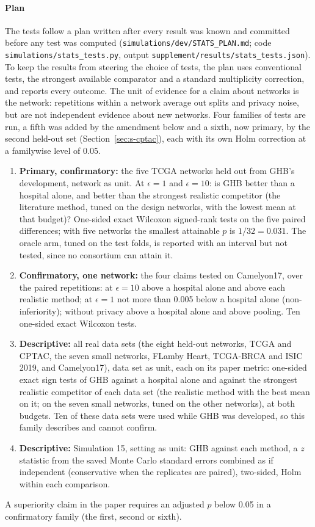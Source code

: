 \documentclass[acmsmall,screen,nonacm]{acmart}
\theoremstyle{acmdefinition}
\begin{document}
\paragraph{Plan} The tests follow a plan written after every result was known and committed before any test was computed (\texttt{simulations/dev/STATS\_PLAN.md}; code \texttt{simulations/stats\_tests.py}, output \texttt{supplement/results/stats\_tests.json}). To keep the results from steering the choice of tests, the plan uses conventional tests, the strongest available comparator and a standard multiplicity correction, and reports every outcome. The unit of evidence for a claim about networks is the network: repetitions within a network average out splits and privacy noise, but are not independent evidence about new networks. Four families of tests are run, a fifth was added by the amendment below and a sixth, now primary, by the second held-out set (Section~\ref{sec:s-cptac}), each with its own Holm correction \cite{holm1979simple} at a familywise level of 0.05.
\begin{enumerate}
\item \textbf{Primary, confirmatory:} the five TCGA networks held out from GHB's development, network as unit. At $\epsilon=1$ and $\epsilon=10$: is GHB better than a hospital alone, and better than the strongest realistic competitor (the literature method, tuned on the design networks, with the lowest mean at that budget)? One-sided exact Wilcoxon signed-rank tests \cite{wilcoxon1945individual} on the five paired differences; with five networks the smallest attainable $p$ is $1/32=0.031$. The oracle arm, tuned on the test folds, is reported with an interval but not tested, since no consortium can attain it.
\item \textbf{Confirmatory, one network:} the four claims tested on Camelyon17, over the \SimCamReps{} paired repetitions: at $\epsilon=10$ above a hospital alone and above each realistic method; at $\epsilon=1$ not more than 0.005 below a hospital alone (non-inferiority); without privacy above a hospital alone and above pooling. Ten one-sided exact Wilcoxon tests.
\item \textbf{Descriptive:} all \SimStAllN{} real data sets (the eight held-out networks, TCGA and CPTAC, the seven small networks, FLamby Heart, TCGA-BRCA and ISIC 2019, and Camelyon17), data set as unit, each on its paper metric: one-sided exact sign tests of GHB against a hospital alone and against the strongest realistic competitor of each data set (the realistic method with the best mean on it; on the seven small networks, tuned on the other networks), at both budgets. Ten of these data sets were used while GHB was developed, so this family describes and cannot confirm.
\item \textbf{Descriptive:} Simulation 15, setting as unit: GHB against each method, a $z$ statistic from the saved Monte Carlo standard errors combined as if independent (conservative when the replicates are paired), two-sided, Holm within each comparison.
\end{enumerate}
A superiority claim in the paper requires an adjusted $p$ below 0.05 in a confirmatory family (the first, second or sixth).
\end{document}
